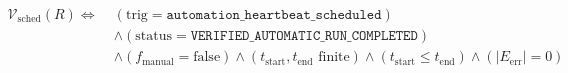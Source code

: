 \begin{equation}
\begin{aligned}
\mathcal{V}_{\text{sched}}(R) \iff\;& (\text{trig} = \texttt{automation\_heartbeat\_scheduled}) \\
&\land (\text{status} = \texttt{VERIFIED\_AUTOMATIC\_RUN\_COMPLETED}) \\
&\land (f_{\text{manual}} = \text{false}) \land (t_{\text{start}}, t_{\text{end}} \text{ finite}) \land (t_{\text{start}} \le t_{\text{end}}) \land (|E_{\text{err}}| = 0)
\end{aligned}
\label{eq:verify_sched}
\end{equation}

